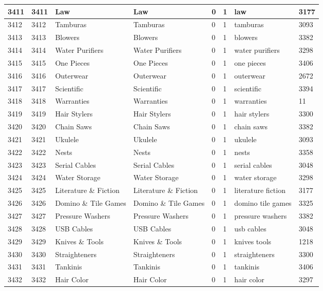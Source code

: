 \begin{longtable}{|l|l|l|l|l|l|l|l|}
3411 & 3411 & Law & Law & 0 & 1 & law & 3177 \\ \hline 
3412 & 3412 & Tamburas & Tamburas & 0 & 1 & tamburas & 3093 \\ \hline 
3413 & 3413 & Blowers & Blowers & 0 & 1 & blowers & 3382 \\ \hline 
3414 & 3414 & Water Purifiers & Water Purifiers & 0 & 1 & water purifiers & 3298 \\ \hline 
3415 & 3415 & One Pieces & One Pieces & 0 & 1 & one pieces & 3406 \\ \hline 
3416 & 3416 & Outerwear & Outerwear & 0 & 1 & outerwear & 2672 \\ \hline 
3417 & 3417 & Scientific & Scientific & 0 & 1 & scientific & 3394 \\ \hline 
3418 & 3418 & Warranties & Warranties & 0 & 1 & warranties & 11 \\ \hline 
3419 & 3419 & Hair Stylers & Hair Stylers & 0 & 1 & hair stylers & 3300 \\ \hline 
3420 & 3420 & Chain Saws & Chain Saws & 0 & 1 & chain saws & 3382 \\ \hline 
3421 & 3421 & Ukulele & Ukulele & 0 & 1 & ukulele & 3093 \\ \hline 
3422 & 3422 & Nests & Nests & 0 & 1 & nests & 3358 \\ \hline 
3423 & 3423 & Serial Cables & Serial Cables & 0 & 1 & serial cables & 3048 \\ \hline 
3424 & 3424 & Water Storage & Water Storage & 0 & 1 & water storage & 3298 \\ \hline 
3425 & 3425 & Literature \& Fiction & Literature \& Fiction & 0 & 1 & literature fiction & 3177 \\ \hline 
3426 & 3426 & Domino \& Tile Games & Domino \& Tile Games & 0 & 1 & domino tile games & 3325 \\ \hline 
3427 & 3427 & Pressure Washers & Pressure Washers & 0 & 1 & pressure washers & 3382 \\ \hline 
3428 & 3428 & USB Cables & USB Cables & 0 & 1 & usb cables & 3048 \\ \hline 
3429 & 3429 & Knives \& Tools & Knives \& Tools & 0 & 1 & knives tools & 1218 \\ \hline 
3430 & 3430 & Straighteners & Straighteners & 0 & 1 & straighteners & 3300 \\ \hline 
3431 & 3431 & Tankinis & Tankinis & 0 & 1 & tankinis & 3406 \\ \hline 
3432 & 3432 & Hair Color & Hair Color & 0 & 1 & hair color & 3297 \\ \hline 

\end{longtable}

